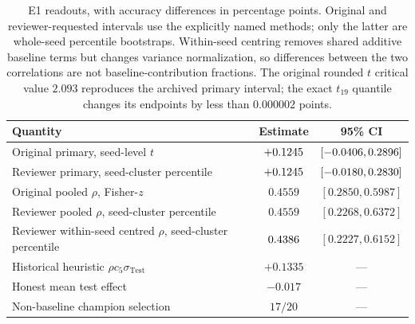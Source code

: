 \begin{table}[tbp]
\centering
\footnotesize
\setlength{\tabcolsep}{5pt}
\begin{tabular}{@{}L{7.3cm}cc@{}}
\toprule
Quantity & Estimate & 95\% CI \\
\midrule
Original primary, seed-level $t$ & $+0.1245$ &
$[-0.0406,0.2896]$ \\
Reviewer primary, seed-cluster percentile & $+0.1245$ &
$[-0.0180,0.2830]$ \\
Original pooled $\rho$, Fisher-$z$ & $0.4559$ &
$[0.2850,0.5987]$ \\
Reviewer pooled $\rho$, seed-cluster percentile & $0.4559$ &
$[0.2268,0.6372]$ \\
Reviewer within-seed centred $\rho$, seed-cluster percentile & $0.4386$ &
$[0.2227,0.6152]$ \\
Historical heuristic $\rho c_5\sigma_{\mathrm{Test}}$ & $+0.1335$ & --- \\
Honest mean test effect & $-0.017$ & --- \\
Non-baseline champion selection & $17/20$ & --- \\
\bottomrule
\end{tabular}
\caption{E1 readouts, with accuracy differences in percentage points.
Original and reviewer-requested intervals use the explicitly named methods;
only the latter are whole-seed percentile bootstraps. Within-seed centring
removes shared additive baseline terms but changes variance normalization,
so differences between the two correlations are not baseline-contribution
fractions. The original rounded $t$ critical value $2.093$ reproduces the
archived primary interval; the exact $t_{19}$ quantile changes its endpoints
by less than $0.000002$ points.}
\label{tab:e1}
\end{table}

